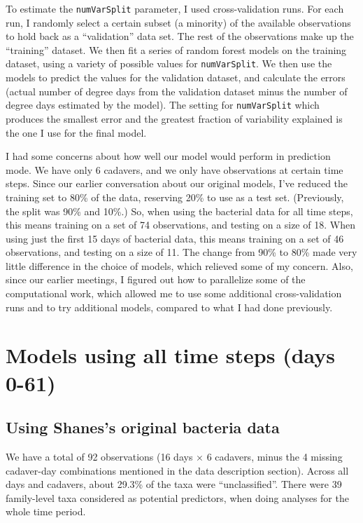 \documentclass{article}
\begin{document}
To estimate the \texttt{numVarSplit} parameter, I used
cross-validation runs.  For each run, I randomly select a certain
subset (a minority) of the available observations to hold back as a
``validation'' data set.  The rest of the observations make up the
``training'' dataset.  We then fit a series of random forest models on
the training dataset, using a variety of possible values for
\texttt{numVarSplit}.  We then use the models to predict the values
for the validation dataset, and calculate the errors (actual number of
degree days from the validation dataset minus the number of degree
days estimated by the model).  The setting for \texttt{numVarSplit}
which produces the smallest error and the greatest fraction of
variability explained is the one I use for the final model.

I had some concerns about how well our model would perform in
prediction mode.  We have only 6 cadavers, and we only have
observations at certain time steps.  Since our earlier conversation
about our original models, I've reduced the training set to 80\% of
the data, reserving 20\% to use as a test set.  (Previously, the split
was 90\% and 10\%.)  So, when using the bacterial data for all time
steps, this means training on a set of 74 observations, and testing on
a size of 18.  When using just the first 15 days of bacterial data,
this means training on a set of 46 observations, and testing on a size
of 11.  The change from 90\% to 80\% made very little difference in
the choice of models, which relieved some of my concern.  Also, since our
earlier meetings, I figured out how to parallelize some of the
computational work, which allowed me to use some additional
cross-validation runs and to try additional models, compared to what I
had done previously.


\section{Models using all time steps (days 0-61)}


\subsection{Using Shanes's original bacteria data}

We have a total of 92 observations (16 days $\times$ 6 cadavers, minus
the 4 missing cadaver-day combinations mentioned in the data
description section).  Across all days and cadavers, about 29.3\% of
the taxa were ``unclassified''.  There were 39 family-level taxa
considered as potential predictors, when doing analyses for the whole
time period.
\end{document}
